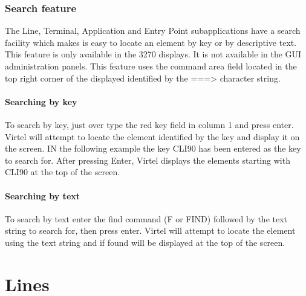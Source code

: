 \documentclass[letterpaper,10pt,english]{sphinxmanual}
\begin{document}
\subsection{Search feature}
\label{\detokenize{connectivity_guide:search-feature}}
\sphinxAtStartPar
The Line, Terminal, Application and Entry Point sub\sphinxhyphen{}applications have a search facility which makes is easy to locate an element by key or by descriptive text. This feature is only available in the 3270 displays. It is not available in the GUI administration panels. This feature uses the command area field located in the top right corner of the displayed identified by the ===\textgreater{} character string.

\sphinxAtStartPar
{}

\sphinxAtStartPar
{}


\subsubsection{Searching by key}
\label{\detokenize{connectivity_guide:searching-by-key}}
\sphinxAtStartPar
To search by key, just over type the red key field in column 1 and press enter. Virtel will attempt to locate the element identified by the key and display it on the screen. IN the following example the key CLI\sphinxhyphen{}90 has been entered as the key to search for. After pressing Enter, Virtel displays the elements starting with CLI\sphinxhyphen{}90 at the top of the screen.

\sphinxAtStartPar
{}


\subsubsection{Searching by text}
\label{\detokenize{connectivity_guide:searching-by-text}}
\sphinxAtStartPar
To search by text enter the find command (F or FIND) followed by the text string to search for, then press enter. Virtel will attempt to locate the element using the text string and if found will be displayed at the top of the screen.

\sphinxAtStartPar
{}

\ignorespaces 

\chapter{Lines}
\label{\detokenize{connectivity_guide:lines}}\label{\detokenize{connectivity_guide:index-4}}
\end{document}
